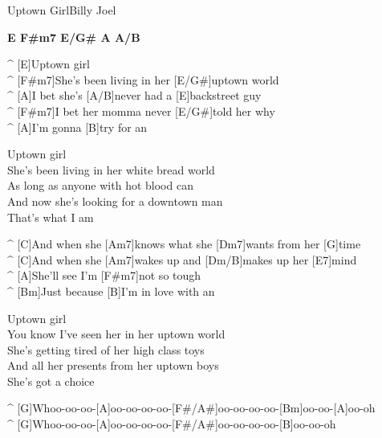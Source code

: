 \begin{song}{Uptown Girl}{Billy Joel}

\begin{guitar}
\textbf{E F#m7 E/G# A A/B}\\
\end{guitar}

\begin{guitar}
^ [E]Uptown girl\\
^ [F#m7]She's been living in her [E/G#]uptown world\\
^ [A]I bet she's [A/B]never had a [E]backstreet guy\\
^ [F#m7]I bet her momma never [E/G#]told her why\\
^ [A]I'm gonna [B]try for an\\
\end{guitar}

\begin{guitar}
Uptown girl\\
She's been living in her white bread world\\
As long as anyone with hot blood can\\
And now she's looking for a downtown man\\
That's what I am\\
\end{guitar}

\begin{guitar}
^ [C]And when she [Am7]knows what she [Dm7]wants from her [G]time\\
^ [C]And when she [Am7]wakes up and [Dm/B]makes up her [E7]mind\\
^ [A]She'll see I'm [F#m7]not so tough\\
^ [Bm]Just because [B]I'm in love with an\\
\end{guitar}

\begin{guitar}
Uptown girl\\
You know I've seen her in her uptown world\\
She's getting tired of her high class toys\\
And all her presents from her uptown boys\\
She's got a choice\\
\end{guitar}

\begin{guitar}
^ [G]Whoo-oo-oo-[A]oo-oo-oo-oo-[F#/A#]oo-oo-oo-oo-[Bm]oo-oo-[A]oo-oh\\
^ [G]Whoo-oo-oo-[A]oo-oo-oo-oo-[F#/A#]oo-oo-oo-oo-[B]oo-oo-oh\\
\end{guitar}


\end{song}
